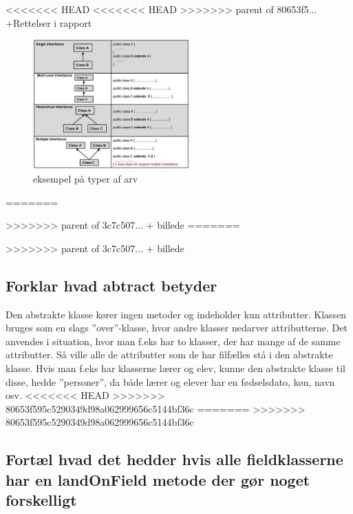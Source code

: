 <<<<<<< HEAD
<<<<<<< HEAD
>>>>>>> parent of 80653f5... +Rettelser i rapport
\begin{figure}[h]\label{fig:types_of_inheritance.jpg} 
    \advance\leftskip-3cm
    \includegraphics[width=6cm]{fig/types_of_inheritance.jpg}
    \caption{eksempel på typer af arv}
\end{figure}
=======

>>>>>>> parent of 3c7c507... + billede
=======

>>>>>>> parent of 3c7c507... + billede
\subsection{Forklar hvad abtract betyder}
Den abstrakte klasse kører ingen metoder og indeholder kun attributter. Klassen bruges som en slags ”over”-klasse, hvor andre klasser nedarver attributterne. Det anvendes i situation, hvor man f.eks har to klasser, der har mange af de samme attributter. Så ville alle de attributter som de har filfælles stå i den abstrakte klasse.
Hvis man f.eks har klasserne lærer og elev, kunne den abstrakte klasse til disse, hedde ”personer”, da både lærer og elever har en fødselsdato, køn, navn osv.
<<<<<<< HEAD
>>>>>>> 80653f595c5290349d98a062999656c5144bf36c
=======
>>>>>>> 80653f595c5290349d98a062999656c5144bf36c

\subsection{Fortæl hvad det hedder hvis alle fieldklasserne har en landOnField metode der gør noget forskelligt}

